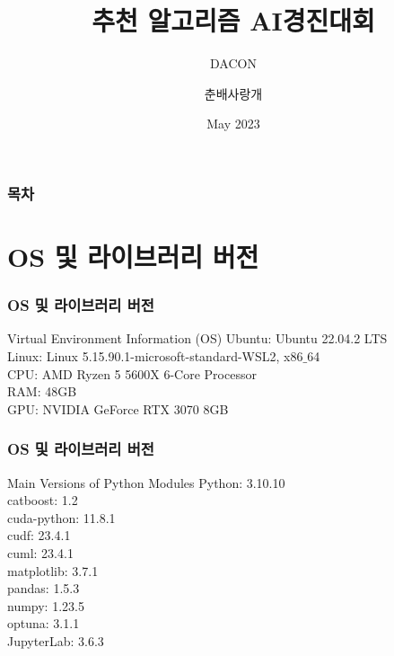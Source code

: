 \documentclass{beamer}
\title[Book Recomendation Algorithm] %
{추천 알고리즘 AI경진대회}
\subtitle{DACON}
\author[춘배사랑개] %
{춘배사랑개}
\date[2023.05] %
{May 2023}
\begin{document}
\frame{\titlepage}


\begin{frame}
\frametitle{목차}
\tableofcontents
\end{frame}

\section{OS 및 라이브러리 버전}
\begin{frame}
\frametitle{OS 및 라이브러리 버전}

\begin{block}{Virtual Environment Information (OS)}
Ubuntu: Ubuntu 22.04.2 LTS\\
Linux: Linux 5.15.90.1-microsoft-standard-WSL2, x86$\_$64 \\
CPU: AMD Ryzen 5 5600X 6-Core Processor\\
RAM: 48GB \\
GPU: NVIDIA GeForce RTX 3070 8GB

\end{block}
\end{frame}

\begin{frame}
\frametitle{OS 및 라이브러리 버전}

\begin{block}{Main Versions of Python Modules}
Python: 3.10.10\\
catboost: 1.2\\
cuda-python: 11.8.1\\
cudf: 23.4.1\\
cuml: 23.4.1\\
matplotlib: 3.7.1\\
pandas: 1.5.3\\
numpy: 1.23.5\\
optuna: 3.1.1\\
JupyterLab: 3.6.3

\end{block}
\end{frame}


\end{document}
